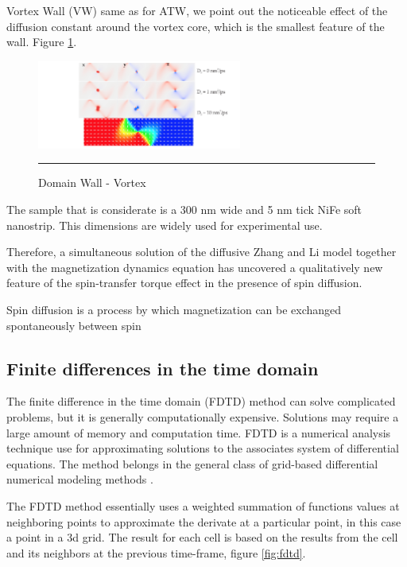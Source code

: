 Vortex Wall (VW) same as for ATW, we point out the noticeable effect of the diffusion constant around the vortex core, which is the smallest feature of the wall. Figure \ref{fig:vw}.

\begin{figure}[htbp]
	\centering
		\includegraphics[width=0.6\textwidth]{Figures/VW.png}
		\rule{35em}{0.5pt}
	\caption[Domain Wall - Vortex]{Domain Wall - Vortex}
	\label{fig:vw}
\end{figure}

The sample that is considerate is a 300 nm wide and 5 nm tick NiFe soft nanostrip. This dimensions are widely used for experimental use.

Therefore, a simultaneous solution of the diffusive Zhang and Li model together with the magnetization dynamics equation has uncovered a qualitatively new feature of the spin-transfer torque effect in the presence of spin diffusion.


Spin diffusion is a process by which magnetization can be exchanged spontaneously between spin






\subsection{Finite differences in the time domain}

The finite difference in the time domain (FDTD) method can solve complicated problems, but it is generally computationally expensive. Solutions may require a large amount of memory and computation time.  FDTD is a numerical analysis technique use for approximating solutions to the associates system of differential equations. The method belongs in the general class of grid-based differential numerical modeling methods \cite{methods}.

The FDTD method essentially uses a weighted summation of functions values at neighboring points to approximate the derivate at a particular point, in this case a point in a 3d grid. The result for each cell is based on the results from the cell and its neighbors at the previous time-frame, figure \ref{fig:fdtd}.  

